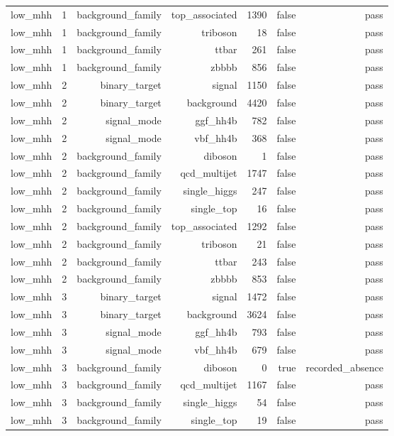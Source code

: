 \begin{table}[htbp]
{\begin{tabular}{lrrrrrr}
low\_mhh & 1 & background\_family & top\_associated & 1390 & false & pass \\
low\_mhh & 1 & background\_family & triboson & 18 & false & pass \\
low\_mhh & 1 & background\_family & ttbar & 261 & false & pass \\
low\_mhh & 1 & background\_family & zbbbb & 856 & false & pass \\
low\_mhh & 2 & binary\_target & signal & 1150 & false & pass \\
low\_mhh & 2 & binary\_target & background & 4420 & false & pass \\
low\_mhh & 2 & signal\_mode & ggf\_hh4b & 782 & false & pass \\
low\_mhh & 2 & signal\_mode & vbf\_hh4b & 368 & false & pass \\
low\_mhh & 2 & background\_family & diboson & 1 & false & pass \\
low\_mhh & 2 & background\_family & qcd\_multijet & 1747 & false & pass \\
low\_mhh & 2 & background\_family & single\_higgs & 247 & false & pass \\
low\_mhh & 2 & background\_family & single\_top & 16 & false & pass \\
low\_mhh & 2 & background\_family & top\_associated & 1292 & false & pass \\
low\_mhh & 2 & background\_family & triboson & 21 & false & pass \\
low\_mhh & 2 & background\_family & ttbar & 243 & false & pass \\
low\_mhh & 2 & background\_family & zbbbb & 853 & false & pass \\
low\_mhh & 3 & binary\_target & signal & 1472 & false & pass \\
low\_mhh & 3 & binary\_target & background & 3624 & false & pass \\
low\_mhh & 3 & signal\_mode & ggf\_hh4b & 793 & false & pass \\
low\_mhh & 3 & signal\_mode & vbf\_hh4b & 679 & false & pass \\
low\_mhh & 3 & background\_family & diboson & 0 & true & recorded\_absence \\
low\_mhh & 3 & background\_family & qcd\_multijet & 1167 & false & pass \\
low\_mhh & 3 & background\_family & single\_higgs & 54 & false & pass \\
low\_mhh & 3 & background\_family & single\_top & 19 & false & pass \\

\end{tabular}}
\end{table}
